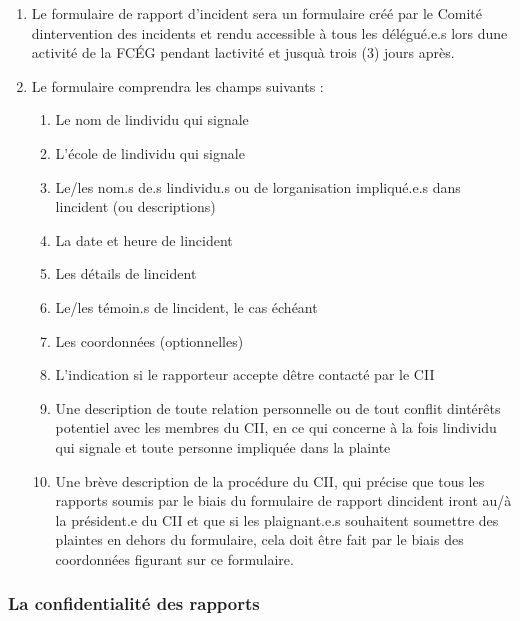 \begin{enumerate}
 \item
  Le formulaire de rapport d'incident sera un formulaire créé par le Comité d\textquotesingle intervention des incidents et rendu accessible à tous les délégué.e.s lors d\textquotesingle une activité de la FCÉG pendant l\textquotesingle activité et jusqu\textquotesingle à trois (3) jours après.
 \item
  Le formulaire comprendra les champs suivants :

  \begin{enumerate}
   \item
    Le nom de l\textquotesingle individu qui signale
   \item
    L'école de l\textquotesingle individu qui signale
   \item
    Le/les nom.s de.s l\textquotesingle individu.s ou de l\textquotesingle organisation impliqué.e.s dans l\textquotesingle incident (ou descriptions)
   \item
    La date et heure de l\textquotesingle incident
   \item
    Les détails de l\textquotesingle incident
   \item
    Le/les témoin.s de l\textquotesingle incident, le cas échéant
   \item
    Les coordonnées (optionnelles)
   \item
    L'indication si le rapporteur accepte d\textquotesingle être contacté par le CII
   \item
    Une description de toute relation personnelle ou de tout conflit d\textquotesingle intérêts potentiel avec les membres du CII, en ce qui concerne à la fois l\textquotesingle individu qui signale et toute personne impliquée dans la plainte
   \item
    Une brève description de la procédure du CII, qui précise que tous les rapports soumis par le biais du formulaire de rapport d\textquotesingle incident iront au/à la président.e du CII et que si les plaignant.e.s souhaitent soumettre des plaintes en dehors du formulaire, cela doit être fait par le biais des coordonnées figurant sur ce formulaire.
  \end{enumerate}
\end{enumerate}

\subsubsection{La confidentialité des rapports}
\label{la-confidentialite-des-rapports}

